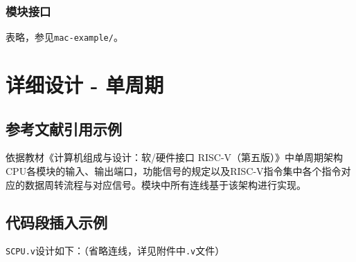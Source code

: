 \documentclass[UTF8,a4paper,autofakebold,15pt]{ctexart}
\begin{document}
\subsubsection{模块接口}

	表略，参见{\tt mac-example/}。

\newpage
\section{详细设计 - 单周期}

\subsection{参考文献引用示例}

依据教材《计算机组成与设计：软/硬件接口 RISC-V（第五版）》\cite{ref1}中单周期架构CPU各模块的输入、输出端口，功能信号的规定以及RISC-V指令集中各个指令对应的数据周转流程与对应信号。模块中所有连线基于该架构进行实现。

\subsection{代码段插入示例}

{\tt SCPU.v}设计如下：（省略连线，详见附件中{\tt .v}文件）
\end{document}
